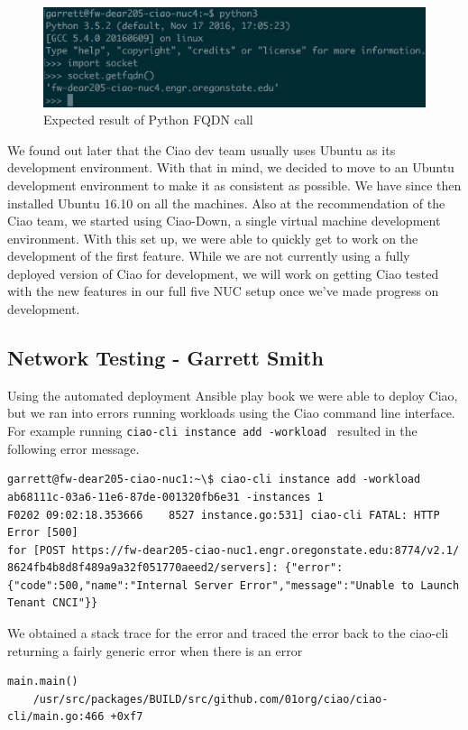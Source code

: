 \documentclass[10pt,onecolumn,journal,draftclsnofoot]{IEEEtran}
\begin{document}
\begin{figure}[h]
	\caption{Expected result of Python FQDN call}
	\centering
	\includegraphics[scale=0.5]{getfqdn.eps}
\end{figure}

We found out later that the Ciao dev team usually uses Ubuntu as its development
environment. With that in mind, we decided to move to an Ubuntu development
environment to make it as consistent as possible. We have since then installed
Ubuntu 16.10 on all the machines. Also at the recommendation of the Ciao team,
we started using Ciao-Down, a single virtual machine development environment.
With this set up, we were able to quickly get to work on the development of the
first feature. While we are not currently using a fully deployed version of Ciao
for development, we will work on getting Ciao tested with the new features in
our full five NUC setup once we've made progress on development.

\subsection{Network Testing - Garrett Smith}

Using the automated deployment Ansible play book we were able to deploy Ciao,
but we ran into errors running workloads using the Ciao command line interface.
For example running \texttt{ciao-cli instance add -workload } resulted in the
following error message.

\begin{lstlisting}[caption = Failing to run a workload]
garrett@fw-dear205-ciao-nuc1:~\$ ciao-cli instance add -workload ab68111c-03a6-11e6-87de-001320fb6e31 -instances 1
F0202 09:02:18.353666    8527 instance.go:531] ciao-cli FATAL: HTTP Error [500] 
for [POST https://fw-dear205-ciao-nuc1.engr.oregonstate.edu:8774/v2.1/
8624fb4b8d8f489a9a32f051770aeed2/servers]: {"error":{"code":500,"name":"Internal Server Error","message":"Unable to Launch Tenant CNCI"}}
\end{lstlisting}

We obtained a stack trace for the error and traced the error back to the
ciao-cli returning a fairly generic error when there is an error 
\begin{lstlisting}[caption = 500 error stack trace portion]
main.main()
    /usr/src/packages/BUILD/src/github.com/01org/ciao/ciao-cli/main.go:466 +0xf7
\end{lstlisting}
\end{document}
